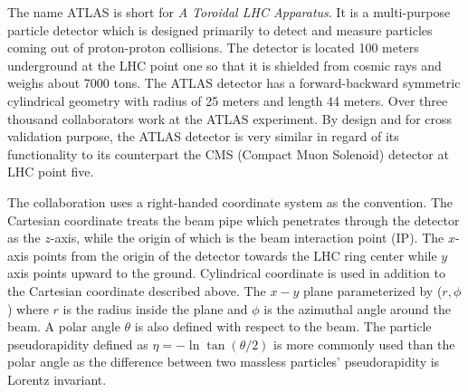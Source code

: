 The name ATLAS is short for \textit{A Toroidal LHC Apparatus}. It is a multi-purpose particle detector which is designed primarily to detect and measure particles coming out of proton-proton collisions. The detector is located 100 meters underground at the LHC point one so that it is shielded from cosmic rays and weighs about 7000 tons. The ATLAS detector has a forward-backward symmetric cylindrical geometry with radius of 25 meters and length 44 meters. Over three thousand collaborators work at the ATLAS experiment. By design and for cross validation purpose, the ATLAS detector is very similar in regard of its functionality to its counterpart the CMS (Compact Muon Solenoid) detector at LHC point five. 

The collaboration uses a right-handed coordinate system as the convention. The Cartesian coordinate treats the beam pipe which penetrates through the detector as the $z$-axis, while the origin of which is the beam interaction point (IP). The $x$-axis points from the origin of the detector towards the LHC ring center while $y$ axis points upward to the ground. Cylindrical coordinate is used in addition to the Cartesian coordinate described above. The $x-y$ plane parameterized by ($r,\phi$) where $r$ is the radius inside the plane and $\phi$ is the azimuthal angle around the beam. A polar angle $\theta$ is also defined with respect to the beam. The particle pseudorapidity defined as $\eta = -\ln \tan(\theta/2)$ is more commonly used than the polar angle as the difference between two massless particles' pseudorapidity is Lorentz invariant. 

